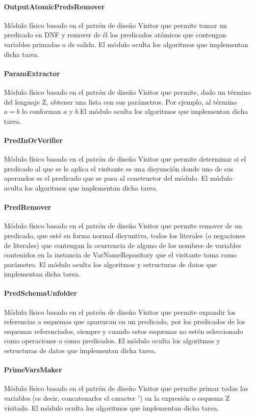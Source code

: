 \documentclass[a4paper,10pt]{report}
\begin{document}
				\paragraph{OutputAtomicPredsRemover}
				Módulo físico basado en el patrón de diseño Visitor que permite tomar un predicado en DNF y remover de él los predicados atómicos que contengan variables primadas o de salida. El módulo oculta los algoritmos que implementan dicha tarea.			
				\paragraph{ParamExtractor}
				Módulo físico basado en el patrón de diseño Visitor que permite, dado un término del lenguaje Z, obtener una lista con sus parámetros. Por ejemplo, al término $a = b$ lo conforman $a$ y $b$.El módulo oculta los algoritmos que implementan dicha tarea.
				\paragraph{PredInOrVerifier}
				Módulo físico basado en el patrón de diseño Visitor que permite determinar si el predicado al que se le aplica el visitante es una disyunción donde uno de sus operandos es el predicado que se pasa al constructor del módulo. El módulo oculta los algoritmos que implementan dicha tarea.
				\paragraph{PredRemover}
				Módulo físico basado en el patrón de diseño Visitor que permite remover de un predicado, que esté en forma normal disyuntiva, todos los literales (o negaciones de literales) que contengan la ocurrencia de alguno de los nombres de variables contenidos en la instancia de VarNameRepository que el visitante toma como parámetro. El módulo oculta los algoritmos y estructuras de datos que implementan dicha tarea.
				\paragraph{PredSchemaUnfolder}
				Módulo físico basado en el patrón de diseño Visitor que permite expandir los referencias a esquemas que aparezcan en un predicado, por los predicados de los esquemas referenciados, siempre y cuando estos esquemas no estén seleccionado como operaciones o como predicados. El módulo oculta los algoritmos y estructuras de datos que implementan dicha tarea.			
				\paragraph{PrimeVarsMaker}
				Módulo físico basado en el patrón de diseño Visitor que permite primar todas las variables (es decir, concatenarles el caracter $'$) en la expresión o esquema Z visitado. El módulo oculta los algoritmos que implementan dicha tarea.
\end{document}
